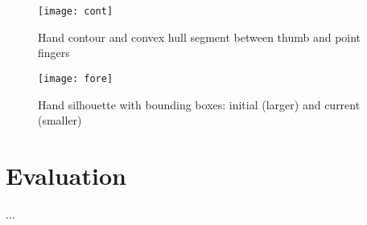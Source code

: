 \documentclass[a4paper, 12pt]{article}
\begin{document}
\begin{figure}
        \centering
        \texttt{[image: cont]}
        \caption{Hand contour and convex hull segment between thumb and point fingers}
        \label{fig:cont}
\end{figure}
\begin{figure}
        \centering
        \texttt{[image: fore]}
        \caption{Hand silhouette with bounding boxes: initial (larger) and current (smaller)}
        \label{fig:fore}
\end{figure}


\section{Evaluation}
...



\end{document}

